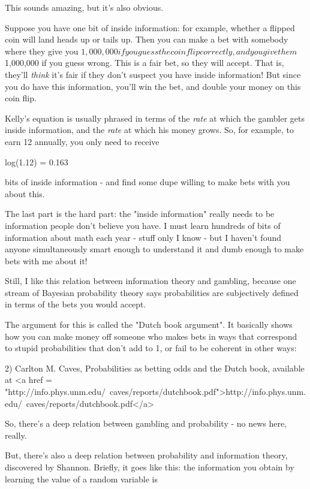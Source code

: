 This sounds amazing, but it's also obvious.  

Suppose you have one bit of inside information: for example, whether a
flipped coin will land heads up or tails up.  Then you can make a bet
with somebody where they give you $1,000,000 if you guess the coin
flip correctly, and you give them $1,000,000 if you guess wrong.  This
is a fair bet, so they will accept.  That is, they'll \emph{think}
it's fair if they don't suspect you have inside information!  But
since you do have this information, you'll win the bet, and double
your money on this coin flip.

Kelly's equation is usually phrased in terms of the \emph{rate} at
which the gambler gets inside information, and the \emph{rate} at
which his money grows.  So, for example, to earn 12%
annually, you only need to receive

log(1.12) = 0.163

bits of inside information - and find some dupe willing to make bets
with you about this.  

The last part is the hard part: the "inside information"
really needs to be information people don't believe you have.  I must
learn hundreds of bits of information about math each year - stuff
only I know - but I haven't found anyone simultaneously smart enough
to understand it and dumb enough to make bets with me about it!

Still, I like this relation between information theory and gambling,
because one stream of Bayesian probability theory says probabilities 
are subjectively defined in terms of the bets you would accept.  

The argument for this is called the "Dutch book argument".
It basically shows how you can make money off someone who makes bets
in ways that correspond to stupid probabilities that don't add to 1,
or fail to be coherent in other ways:

2) Carlton M. Caves, Probabilities as betting odds and the Dutch book,
available at <a href = "http://info.phys.unm.edu/~caves/reports/dutchbook.pdf">http://info.phys.unm.edu/~caves/reports/dutchbook.pdf</a>

So, there's a deep relation between gambling and probability - no news 
here, really.

But, there's also a deep relation between probability and information 
theory, discovered by Shannon.  Briefly, it goes like this: the 
information you obtain by learning the value of a random variable is



